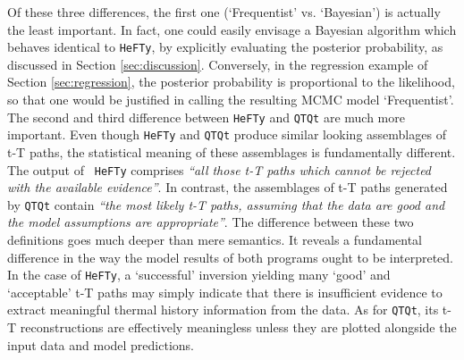 \documentclass{article}
\begin{document}
Of these three differences, the first one (`Frequentist'
vs. `Bayesian') is actually the least important. In fact, one
could easily envisage a Bayesian algorithm which behaves identical to
{\tt HeFTy}, by explicitly evaluating the posterior probability, as
discussed in Section \ref{sec:discussion}.  Conversely, in the
regression example of Section \ref{sec:regression}, the posterior
probability is proportional to the likelihood, so that one would be
justified in calling the resulting MCMC model `Frequentist'.  The
second and third difference between {\tt HeFTy} and {\tt QTQt} are
much more important.  Even though {\tt HeFTy} and {\tt QTQt} produce
similar looking assemblages of t-T paths, the statistical meaning of
these assemblages is fundamentally different. The output of {\tt
  HeFTy} comprises \emph{``all those t-T paths which cannot be
  rejected with the available evidence''}. In contrast, the
assemblages of t-T paths generated by {\tt QTQt} contain \emph{``the
  most likely t-T paths, assuming that the data are good and the model
  assumptions are appropriate''}. The difference between these two
definitions goes much deeper than mere semantics.  It reveals a
fundamental difference in the way the model results of both programs
ought to be interpreted. In the case of {\tt HeFTy}, a `successful'
inversion yielding many `good' and `acceptable' t-T paths may simply
indicate that there is insufficient evidence to extract meaningful
thermal history information from the data. As for {\tt QTQt}, its t-T
reconstructions are effectively meaningless unless they are plotted
alongside the input data and model predictions.  \\
\end{document}
